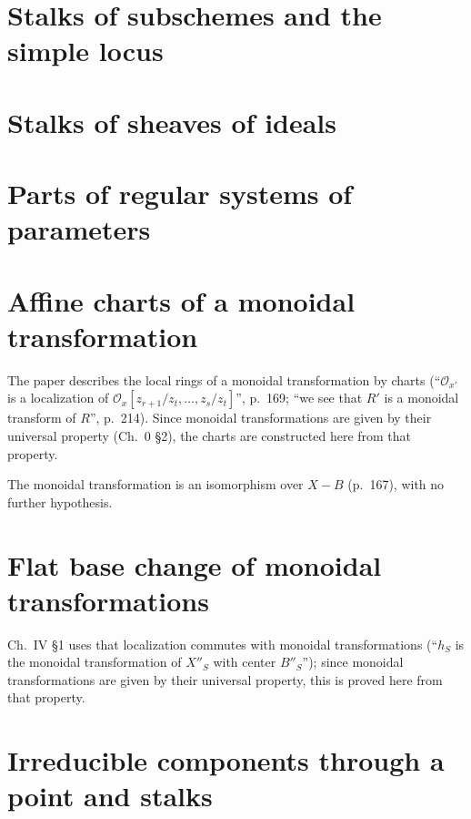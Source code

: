 
\section{Stalks of subschemes and the simple locus}

\section{Stalks of sheaves of ideals}

\section{Parts of regular systems of parameters}

\section{Affine charts of a monoidal transformation}

The paper describes the local rings of a monoidal transformation by charts
(``$\mathcal O_{x'}$ is a localization of $\mathcal O_x[z_{r+1}/z_t,\dots,z_s/z_t]$'', p.~169;
``we see that $R'$ is a monoidal transform of $R$'', p.~214).  Since monoidal transformations
are given by their universal property (Ch.~0 \S2), the charts are constructed here from that
property.


The monoidal transformation is an isomorphism over $X-B$ (p.~167), with no further hypothesis.

\section{Flat base change of monoidal transformations}

Ch.~IV \S1 uses that localization commutes with monoidal transformations (``$h_S$ is the
monoidal transformation of $X''_S$ with center $B''_S$''); since monoidal transformations are
given by their universal property, this is proved here from that property.


\section{Irreducible components through a point and stalks}


